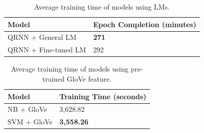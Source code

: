 \documentclass[a4paper,twoside,phd]{BYUPhys}
\begin{document}
\begin{table}[H]
	\centering
	
	\begin{tabular}{|p{4.2cm}|p{5cm}|}
		\hline
		
		\textbf{Model} & \textbf{Epoch Completion \newline (minutes)}                                                                                                                                                                                                                                                                                                                                                    \\
		\hline                                                                                                                                              
		
		QRNN + General LM  & \textbf{271}  \\
		\hline
		
		QRNN + \newline Fine-tuned LM  & 292  \\
		\hline
		
		
	\end{tabular}
	\caption{Average training time of models using LMs.}
	\label{table:QRNNTrainingTime}
\end{table}

\begin{table}[H]
	\centering
	
	\begin{tabular}{|p{4.2cm}|p{5cm}|}
		\hline
		
		\textbf{Model} & \textbf{Training Time (seconds)}                                                                                                                                                                                                                                                                                                                                                    \\
		\hline                                                                                                                                           
		
		NB + GloVe & 3,628.82 \\
		\hline     
		
		SVM + GloVe & \textbf{3,558.26} \\
		\hline                                                                                                                                        
		
	\end{tabular}
	\caption{Average training time of models using pre-trained GloVe feature.}
	\label{table:PreTrainedTrainingTime}
\end{table}
\end{document}
